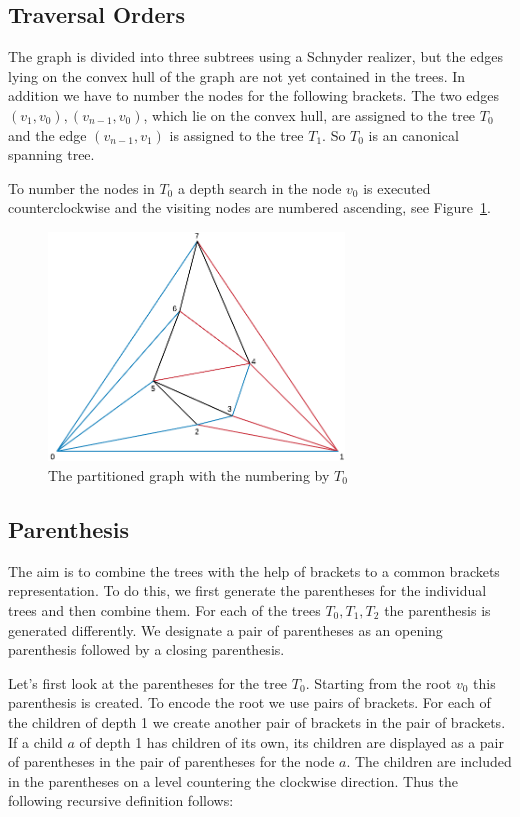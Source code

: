 \documentclass[a4paper]{scrartcl}
\begin{document}
\subsection{Traversal Orders}
The graph is divided into three subtrees using a Schnyder realizer, but the edges lying on the convex hull of the graph are not yet contained in the trees. In addition we have to number the nodes for the following brackets. 
The two edges $(v_1,v_0),(v_{n-1},v_0)$, which lie on the convex hull, are assigned to the tree $T_0$ and the edge $(v_{n-1},v_1)$ is assigned to the tree $T_1$. So $T_0$ is an canonical spanning tree.

To number the nodes in $T_0$ a depth search in the node $v_0$ is executed counterclockwise and the visiting nodes are numbered ascending, see Figure~\ref{fig:exampleTraversal}.

\begin{figure}[h]
	\centering
	\includegraphics[width=0.7\textwidth]{img/exampleTraversal}
	\caption{The partitioned graph with the numbering by $T_0$}
	\label{fig:exampleTraversal}
\end{figure}




\subsection{Parenthesis}
The aim is to combine the trees with the help of brackets to a common brackets representation. To do this, we first generate the parentheses for the individual trees and then combine them. For each of the trees $T_0,T_1,T_2$ the parenthesis is generated differently. We designate a pair of parentheses as an opening parenthesis followed by a closing parenthesis.

Let's first look at the parentheses for the tree $T_0$. Starting from the root $v_0$ this parenthesis is created. To encode the root we use pairs of brackets. For each of the children of depth 1 we create another pair of brackets in the pair of brackets. If a child $a$ of depth 1 has children of its own, its children are displayed as a pair of parentheses in the pair of parentheses for the node $a$. The children are included in the parentheses on a level countering the clockwise direction. Thus the following recursive definition follows:
\end{document}
